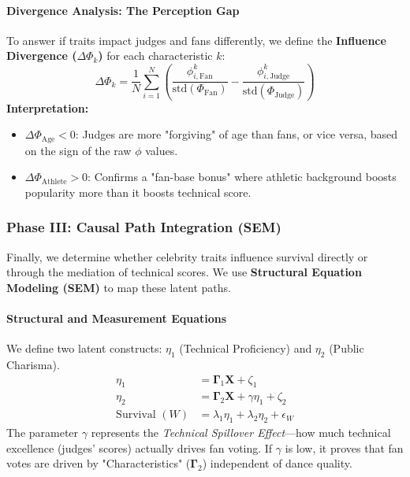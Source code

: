 \documentclass[12pt]{article}
\begin{document}
\paragraph{Divergence Analysis: The Perception Gap}
To answer if traits impact judges and fans differently, we define the \textbf{Influence Divergence ($\Delta \Phi_k$)} for each characteristic $k$:
\begin{equation}
    \Delta \Phi_k = \frac{1}{N} \sum_{i=1}^N \left( \frac{\phi_{i, \text{Fan}}^k}{\text{std}(\Phi_{\text{Fan}})} - \frac{\phi_{i, \text{Judge}}^k}{\text{std}(\Phi_{\text{Judge}})} \right)
\end{equation}
\textbf{Interpretation:}
\begin{itemize}
    \item $\Delta \Phi_{\text{Age}} < 0$: Judges are more "forgiving" of age than fans, or vice versa, based on the sign of the raw $\phi$ values.
    \item $\Delta \Phi_{\text{Athlete}} > 0$: Confirms a "fan-base bonus" where athletic background boosts popularity more than it boosts technical score.
\end{itemize}

\subsubsection{Phase III: Causal Path Integration (SEM)}

Finally, we determine whether celebrity traits influence survival directly or through the mediation of technical scores. We use \textbf{Structural Equation Modeling (SEM)} to map these latent paths.

\paragraph{Structural and Measurement Equations}
We define two latent constructs: $\eta_1$ (Technical Proficiency) and $\eta_2$ (Public Charisma).
\begin{align}
    \eta_1 &= \bm{\Gamma}_1 \mathbf{X} + \zeta_1 \\
    \eta_2 &= \bm{\Gamma}_2 \mathbf{X} + \gamma \eta_1 + \zeta_2 \\
    \text{Survival } (W) &= \lambda_1 \eta_1 + \lambda_2 \eta_2 + \epsilon_W
\end{align}
The parameter $\gamma$ represents the \textit{Technical Spillover Effect}—how much technical excellence (judges' scores) actually drives fan voting. If $\gamma$ is low, it proves that fan votes are driven by "Characteristics" ($\bm{\Gamma}_2$) independent of dance quality.
\end{document}
